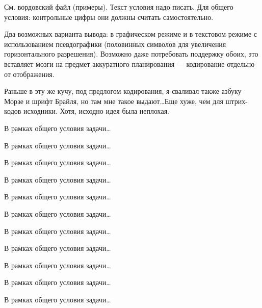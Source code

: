 
См. вордовский файл (примеры). Текст условия надо писать.
Для общего условия: контрольные цифры они должны считать самостоятельно.

Два возможных варианта вывода: в графическом режиме и в текстовом режиме с
использованием псевдографики (половинных символов для увеличения горизонтального
разрешения). Возможно даже потребовать поддержку обоих, это вставляет мозги на
предмет аккуратного планирования --- кодирование отдельно от отображения.

Раньше в эту же кучу, под предлогом кодирования, я сваливал также азбуку Морзе и
шрифт Брайля, но там мне такое выдают\dots Еще хуже, чем для штрих-кодов исходники.
Хотя, исходно идея была неплохая.

\begin{zztask}[EAN-8]
В рамках общего условия задачи\dots
\end{zztask}

\begin{zztask}[EAN-13]
В рамках общего условия задачи\dots
\end{zztask}

\begin{zztask}[UPC-A]
В рамках общего условия задачи\dots
\end{zztask}

\begin{zztask}[UPC-E]
В рамках общего условия задачи\dots
\end{zztask}

\begin{zztask}[CODE-39]
В рамках общего условия задачи\dots
\end{zztask}

\begin{zztask}[CODE-93]
В рамках общего условия задачи\dots
\end{zztask}

\begin{zztask}[CODE-128]
В рамках общего условия задачи\dots
\end{zztask}

\begin{zztask}[CODABAR]
В рамках общего условия задачи\dots
\end{zztask}

\begin{zztask}[ITF]
В рамках общего условия задачи\dots
\end{zztask}

\begin{zztask}[QR-CODE]
В рамках общего условия задачи\dots
\end{zztask}

\begin{zztask}
В рамках общего условия задачи\dots
\end{zztask}
